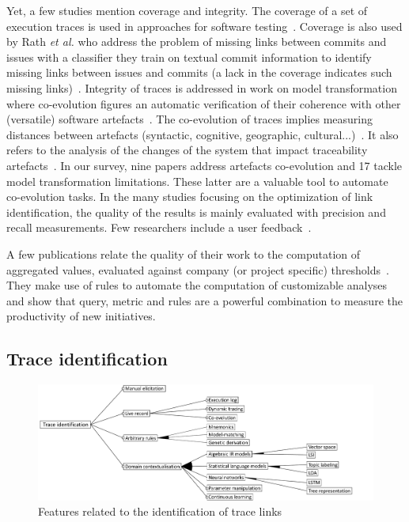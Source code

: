 Yet, a few studies mention coverage and integrity.
The coverage of a set of execution traces is used in approaches for software testing~\cite{gannous2019-Certification-into-Model-based-Testing-for-Safety-Critical-Systems}. Coverage is also used by Rath \textit{et al.} who address the problem of missing links between commits and issues with a classifier they train on textual commit information to identify missing links between issues and commits (\ie a lack in the coverage indicates such missing links)~\cite{rath2018-guo-augmenting-incomplete-traces}. Integrity of traces is addressed in work on model transformation where co-evolution figures an automatic verification of their coherence with other (versatile) software artefacts~\cite{Szabo_2013,slotosch2018-Modeling-and-Certification-of-MDD-Processes}. 
The co-evolution of traces implies measuring distances between artefacts (syntactic, cognitive, geographic, cultural...)~\cite{bjarnasson20016-theory-of-distances-in-SE}.  It also refers to the analysis of the changes of the system that impact traceability artefacts~\cite{goknil2014-change-impact-analysis-for-requirement-metamodel,vonknethen2002-change-oriented-req-traceability-evolution-of-embedded-systems}. In our survey, nine papers address artefacts co-evolution and 17 tackle model transformation limitations. These latter are a valuable tool to automate co-evolution tasks. 
In the many studies focusing on the optimization of link identification, the quality of the results is mainly evaluated with precision and recall measurements. Few researchers include a user feedback~\cite{borg2014-SmS-IR-for-traceability}.

A few publications relate the quality of their work to the computation of aggregated values, evaluated against company (or project specific) thresholds~\cite{Bunder_2017_query-for-quality}. They make use of rules to automate the computation of customizable analyses and show that query, metric and rules are a powerful combination to measure the productivity of new initiatives.

\subsection{Trace identification}
\label{sec:fm:identification}
\begin{figure}[h]
	\centering
	\includegraphics[width=.8\linewidth]{images/fm-identification}
	\caption{Features related to the identification of trace links}
	\label{fig:fm:identification}
\end{figure}

